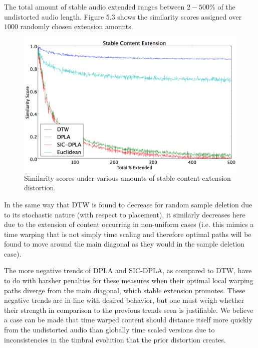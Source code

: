 \documentclass[a4paper,12pt]{report} 	%
\numberwithin{figure}{chapter}
\numberwithin{table}{chapter}
\numberwithin{equation}{chapter}
\begin{document}
\begin{flushleft}
The total amount of stable audio extended ranges between $2-500\%$ of the undistorted audio length. Figure 5.3 shows the similarity scores assigned over $1000$ randomly chosen extension amounts.

\begin{figure}[h!]
\begin{center}
\includegraphics[scale=0.5,width=\linewidth]{StableExtension}
\caption[Extension of Stable Timbral Content Results]{Similarity scores under various amounts of stable content extension distortion.}
\end{center}
\end{figure}
In the same way that DTW is found to decrease for random sample deletion due to its stochastic nature (with respect to placement), it similarly decreases here due to the extension of content occurring in non-uniform cases (i.e. this mimics a time warping that is not simply time scaling and therefore optimal paths will be found to move around the main diagonal as they would in the sample deletion case). 

The more negative trends of DPLA and SIC-DPLA, as compared to DTW, have to do with harsher penalties for these measures when their optimal local warping paths diverge from the main diagonal, which stable extension promotes. These negative trends are in line with desired behavior, but one must weigh whether their strength in comparison to the previous trends seen is justifiable. We believe a case can be made that time warped content should distance itself more quickly from the undistorted audio than globally time scaled versions due to inconsistencies in the timbral evolution that the prior distortion creates. 


\end{flushleft}
\end{document}
